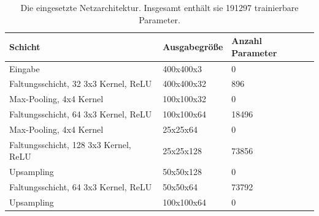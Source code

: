 \begin{table}
    \centering
    \caption{Die eingesetzte Netzarchitektur. Insgesamt enth\"alt sie
        191297 trainierbare Parameter.}
    \label{tab:netzarchitektur}
    \begin{tabular}{|l|l|l|}
        \hline

        \textbf{Schicht}                      & \textbf{Ausgabegr\"o{\ss}e} & \textbf{Anzahl Parameter} \\

        \hline

        Eingabe                               & 400x400x3                   & 0                         \\

        \hline

        Faltungsschicht, 32 3x3 Kernel, ReLU  & 400x400x32                  & 896                       \\

        \hline

        Max-Pooling, 4x4 Kernel               & 100x100x32                  & 0                         \\

        \hline

        Faltungsschicht, 64 3x3 Kernel, ReLU  & 100x100x64                  & 18496                     \\

        \hline

        Max-Pooling, 4x4 Kernel               & 25x25x64                    & 0                         \\

        \hline

        Faltungsschicht, 128 3x3 Kernel, ReLU & 25x25x128                   & 73856                     \\

        \hline

        Upsampling                            & 50x50x128                   & 0                         \\

        \hline

        Faltungsschicht, 64 3x3 Kernel, ReLU  & 50x50x64                    & 73792                     \\

        \hline

        Upsampling                            & 100x100x64                  & 0                         \\


\end{tabular}
\end{table}
